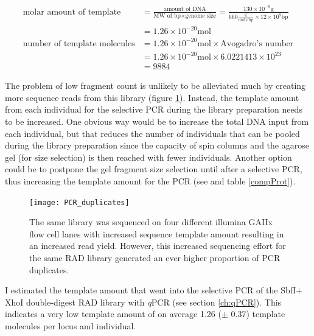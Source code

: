 \documentclass[a4paper,12pt,times,print,index,custombib,custommargin]{PhDThesisPSnPDF}\usepackage[]{graphicx}\usepackage[]{color}
\begin{document}
\footnotesize
\begin{align}
\text{molar amount of template} &= \frac{\text{amount of DNA}}{\text{MW of bp} \times \text{genome size}} 
= \frac{130 \times 10^{-9}\text{g}}{660 \frac{\text{g}}{\text{mol} \times \text{bp}} \times 12 \times 10^{9} \text{bp}} \label{eq:genome_copies} \\
&= 1.26 \times 10^{-20} \text{mol} \nonumber \\[5pt]
\text{number of template molecules} &= 1.26 \times 10^{-20} \text{mol} \times \text{Avogadro's number} \nonumber \\
&= 1.26 \times 10^{-20} \text{mol} \times 6.0221413 \times 10^{23} \nonumber \\
&= 9884 \nonumber
\end{align}
\normalsize

The problem of low \gls{fragment} count is unlikely to be alleviated much by creating more sequence reads from this library (figure \ref{PCRduplicates}). Instead, the template amount from each individual for the selective PCR during the library preparation needs to be increased. One obvious way would be to increase the total DNA input from each individual, but that reduces the number of individuals that can be pooled during the library preparation since the capacity of spin columns and the agarose gel (for size selection) is then reached with fewer individuals. Another option could be to postpone the gel fragment size selection until after a selective PCR, thus increasing the template amount for the PCR (see \citealt{Parchman2012} and table \ref{compProt}).

\begin{figure}
\begin{center}
\texttt{[image: PCR\_duplicates]}
\caption{The same library was sequenced on four different illumina GAIIx flow cell lanes with increased sequence template amount resulting in an increased read yield. However, this increased sequencing effort for the same RAD library generated an ever higher proportion of PCR duplicates.}
\label{PCRduplicates}
\end{center}
\end{figure}


I estimated the template amount that went into the selective PCR of the SbfI$+$XhoI double-digest RAD library with \textit{q}PCR (see section \ref{ch:qPCR}). This indicates a very low template amount of on average 1.26 ($\pm$ 0.37) template molecules per locus and individual.
\end{document}

